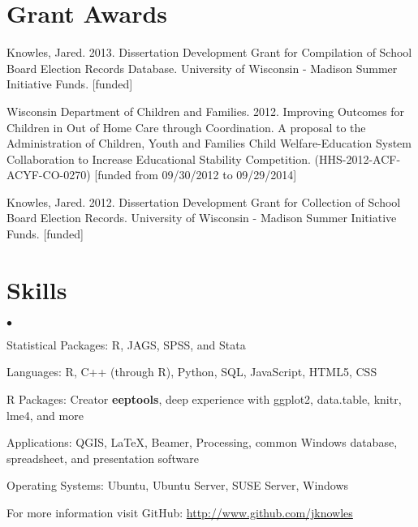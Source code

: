 \documentclass[margin,line]{res}
\newenvironment{list2}{
  \begin{list}{$\bullet$}{%
      \setlength{\itemsep}{0in}
      \setlength{\parsep}{0in} \setlength{\parskip}{0in}
      \setlength{\topsep}{0in} \setlength{\partopsep}{0in} 
      \setlength{\leftmargin}{0.2in}}}{\end{list}}
\begin{document}
\begin{resume}




\section{\sc Grant Awards}


Knowles, Jared. 2013. Dissertation Development Grant for Compilation of School Board Election Records Database. University of Wisconsin - Madison Summer Initiative Funds. [funded]

Wisconsin Department of Children and Families. 2012. Improving Outcomes for Children in Out of Home Care through Coordination. A proposal to the Administration of Children, Youth and Families 
 Child Welfare-Education System Collaboration to Increase Educational Stability Competition. (HHS-2012-ACF-ACYF-CO-0270) [funded from 09/30/2012 to 09/29/2014]

Knowles, Jared. 2012. Dissertation Development Grant for Collection of School Board Election Records. University of Wisconsin - Madison Summer Initiative Funds. [funded]

\section{\sc Skills} 
\begin{list2}
\item Statistical Packages:  R, JAGS, SPSS, and Stata
\item Languages:  R, C++ (through R), Python, SQL, JavaScript, HTML5, CSS
\item R Packages: Creator \textbf{eeptools}, deep experience with ggplot2, data.table, knitr, lme4, and more
\item Applications: QGIS, \LaTeX, Beamer, Processing, common Windows
  database, spreadsheet, and presentation software
\item Operating Systems:  Ubuntu, Ubuntu Server, SUSE Server, Windows
\item For more information visit GitHub: \url{http://www.github.com/jknowles}\\
\end{list2}


\end{resume}
\end{document}
